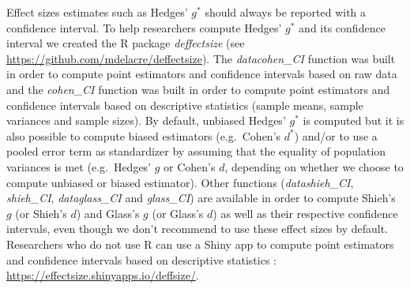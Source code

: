 \documentclass[
  english,
  man]{apa6}
\begin{document}
Effect sizes estimates such as Hedges' \(g^*\) should always be reported with a confidence interval. To help researchers compute Hedges' \(g^*\) and its confidence interval we created the R package \emph{deffectsize} (see \url{https://github.com/mdelacre/deffectsize}). The \emph{datacohen\_CI} function was built in order to compute point estimators and confidence intervals based on raw data and the \emph{cohen\_CI} function was built in order to compute point estimators and confidence intervals based on descriptive statistics (sample means, sample variances and sample sizes). By default, unbiased Hedges' \(g^*\) is computed but it is also possible to compute biased estimators (e.g.~Cohen's \(d^*\)) and/or to use a pooled error term as standardizer by assuming that the equality of population variances is met (e.g.~Hedges' \(g\) or Cohen's \(d\), depending on whether we choose to compute unbiased or biased estimator). Other functions (\emph{datashieh\_CI}, \emph{shieh\_CI}, \emph{dataglass\_CI} and \emph{glass\_CI}) are available in order to compute Shieh's \(g\) (or Shieh's \(d\)) and Glass's \(g\) (or Glass's \(d\)) as well as their respective confidence intervals, even though we don't recommend to use these effect sizes by default. Researchers who do not use R can use a Shiny app to compute point estimators and confidence intervals based on descriptive statistics : \url{https://effectsize.shinyapps.io/deffsize/}.
\end{document}
